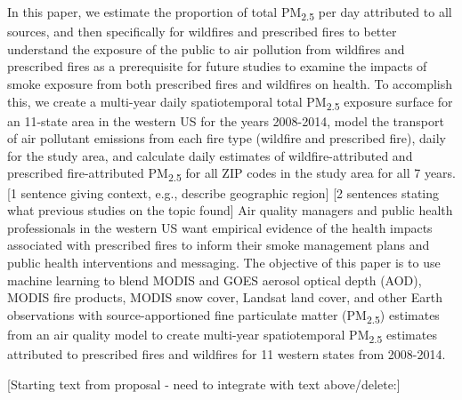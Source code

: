 \documentclass[authoryear]{elsarticle}
\begin{document}
In this paper, we estimate the proportion of total PM\textsubscript{2.5} per day attributed to all sources, and then specifically for wildfires and prescribed fires to better understand the exposure of the public to air pollution from wildfires and prescribed fires as a prerequisite for future studies to examine the impacts of smoke exposure from both prescribed fires and wildfires on health.
To accomplish this, we create a multi-year daily spatiotemporal total PM\textsubscript{2.5} exposure surface for an 11-state area in the western US for the years 2008-2014, model the transport of air pollutant emissions from each fire type (wildfire and prescribed fire), daily for the study area, and calculate daily estimates of wildfire-attributed and prescribed fire-attributed PM\textsubscript{2.5} for all ZIP codes in the study area for all 7 years.
[1 sentence giving context, e.g., describe geographic region]
[2 sentences stating what previous studies on the topic found]
Air quality managers and public health professionals in the western US want empirical evidence of the health impacts associated with prescribed fires to inform their smoke management plans and public health interventions and messaging. 
The objective of this paper is to use machine learning to blend MODIS and GOES aerosol optical depth (AOD), MODIS fire products, MODIS snow cover, Landsat land cover, and other Earth observations with source-apportioned fine particulate matter (PM\textsubscript{2.5}) estimates from an air quality model to create multi-year spatiotemporal PM\textsubscript{2.5} estimates attributed to prescribed fires and wildfires for 11 western states from 2008-2014.

[Starting text from proposal - need to integrate with text above/delete:]
\end{document}
